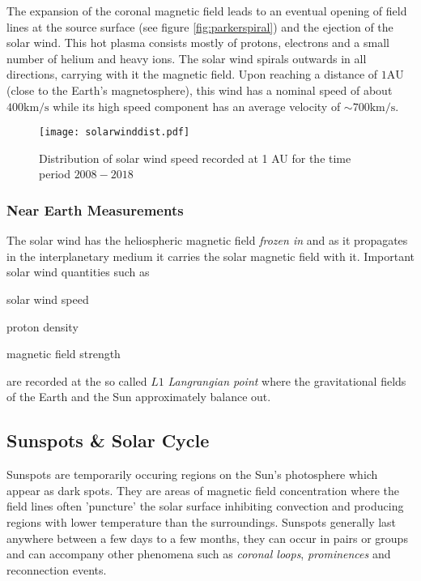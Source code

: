 The expansion of the coronal magnetic field leads to an eventual opening of field lines at the source surface 
(see figure \ref{fig:parkerspiral}) and the ejection of the solar wind. This hot plasma consists mostly of protons, 
electrons and a small number of helium and heavy ions. The solar wind spirals outwards in all directions, carrying 
with it the magnetic field. Upon reaching a distance of $1 \text{AU}$ (close to the Earth's magnetosphere), this wind 
has a nominal speed of about $400 \text{km}/\text{s}$ while its high speed component has an average velocity of 
$\sim 700 \text{km}/\text{s}$.

\begin{figure}
    \noindent\centering\texttt{[image: solarwinddist.pdf]}
    \caption{
        \small{Distribution of solar wind speed recorded at 1 AU for the time period $2008 - 2018$}}
    \label{fig:solarwinddist}
\end{figure}

\subsubsection*{Near Earth Measurements}

The solar wind has the heliospheric magnetic field \emph{frozen in} and as it propagates in the interplanetary medium 
it carries the solar magnetic field with it. Important solar wind quantities such as 
\begin{enumerate*} \item solar wind speed \item proton density \item magnetic field strength \end{enumerate*} are recorded 
at the so called $L1$ \emph{Langrangian point} where the gravitational fields of the Earth and the Sun 
approximately balance out.



\subsection{Sunspots \& Solar Cycle}\label{sec:sunspots}

Sunspots are temporarily occuring regions on the Sun's photosphere which appear as dark spots. They are areas 
of magnetic field concentration where the field lines often 'puncture' the solar surface inhibiting convection 
and producing regions with lower temperature than the surroundings. Sunspots generally last anywhere between a 
few days to a few months, they can occur in pairs or groups and can accompany other phenomena such as 
\emph{coronal loops}, \emph{prominences} and reconnection events.

